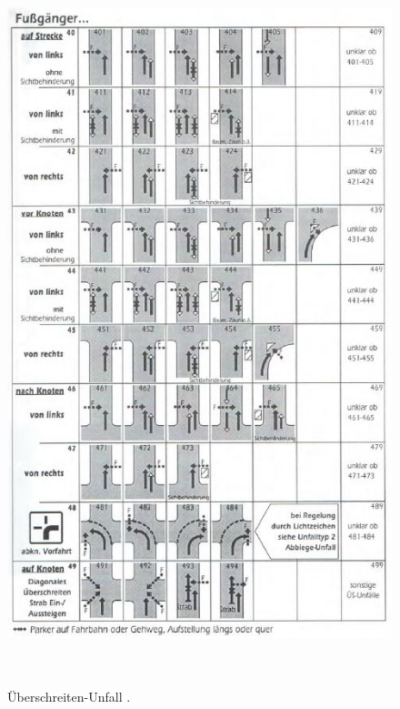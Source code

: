 \begin{savenotes}
	\begin{figure}[H]
		\centering
		\includegraphics[width=13cm,height=21cm]{figures/FT4}
		\caption[Überschreiten-Unfall nach GDV]{Überschreiten-Unfall \parencite[S. 15]{GesamtverbandderDeutschenVersicherungswirtschafte.V..2016}. }\label{fig:FT4}
	\end{figure}
\end{savenotes}

